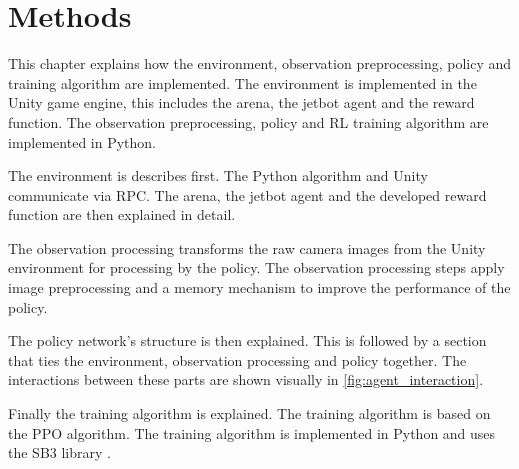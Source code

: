 \chapter{Methods}
\label{cha:Methods}

This chapter explains how the environment, observation preprocessing, policy and training algorithm are implemented. The environment is implemented in the Unity game engine, this includes the arena, the jetbot agent and the reward function. The observation preprocessing, policy and \ac{RL} training algorithm are implemented in Python.

The environment is describes first. The Python algorithm and Unity communicate via \ac{RPC}. The arena, the jetbot agent and the developed reward function are then explained in detail.

The observation processing transforms the raw camera images from the Unity environment for processing by the policy. The observation processing steps apply image preprocessing and a memory mechanism to improve the performance of the policy.

The policy network's structure is then explained. This is followed by a section that ties the environment, observation processing and policy together. The  interactions between these parts are shown visually in \ref{fig:agent_interaction}.

Finally the training algorithm is explained. The training algorithm is based on the \ac{PPO} algorithm. The training algorithm is implemented in Python and uses the \ac{SB3} library \autocite{sb3}.

